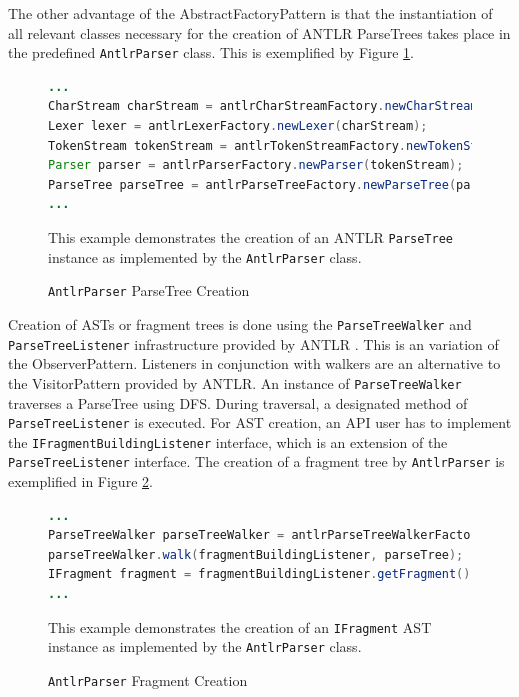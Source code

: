 The other advantage of the \gls{AbstractFactoryPattern} is that the instantiation of all relevant classes necessary for the creation of \gls{ANTLR} \glspl{ParseTree} takes place in the predefined \texttt{AntlrParser} class.
This is exemplified by Figure \ref{figure:AntlrParserParseTreeCreation}.

\begin{figure}[h!]
\begin{lstlisting}[language=Java]
...
CharStream charStream = antlrCharStreamFactory.newCharStream(inputStream);
Lexer lexer = antlrLexerFactory.newLexer(charStream);
TokenStream tokenStream = antlrTokenStreamFactory.newTokenStream(lexer);
Parser parser = antlrParserFactory.newParser(tokenStream);
ParseTree parseTree = antlrParseTreeFactory.newParseTree(parser);
...
\end{lstlisting}
{
\scriptsize
This example demonstrates the creation of an \gls{ANTLR} \texttt{ParseTree} instance as implemented by the \texttt{AntlrParser} class.
}
\caption{\texttt{AntlrParser} \gls{ParseTree} Creation}
\label{figure:AntlrParserParseTreeCreation}
\end{figure}

Creation of \glspl{AST} or fragment trees is done using the \texttt{ParseTreeWalker} and \texttt{ParseTreeListener} infrastructure provided by \gls{ANTLR} \cite{Parr:2013:DAR:2501720}.
This is an variation of the \gls{ObserverPattern}.
Listeners in conjunction with walkers are an alternative to the \gls{VisitorPattern} provided by \gls{ANTLR}.
An instance of \texttt{Parse\-Tree\-Walker} traverses a \gls{ParseTree} using \gls{DFS}.
During traversal, a designated method of \texttt{Parse\-Tree\-Listener} is executed.
For \gls{AST} creation, an \gls{API} user has to implement the \texttt{IFragmentBuildingListener} interface, which is an extension of the \texttt{ParseTreeListener} interface.
The creation of a fragment tree by \texttt{AntlrParser} is exemplified in Figure \ref{figure:AntlrParserFragmentCreation}.

\begin{figure}[h!]
\begin{lstlisting}[language=Java]
...
ParseTreeWalker parseTreeWalker = antlrParseTreeWalkerFactory.newParseTreeWalker();
parseTreeWalker.walk(fragmentBuildingListener, parseTree);
IFragment fragment = fragmentBuildingListener.getFragment();
...
\end{lstlisting}
{
\scriptsize
This example demonstrates the creation of an \texttt{IFragment} \gls{AST} instance as implemented by the \texttt{AntlrParser} class.
}
\caption{\texttt{AntlrParser} Fragment Creation}
\label{figure:AntlrParserFragmentCreation}
\end{figure}

